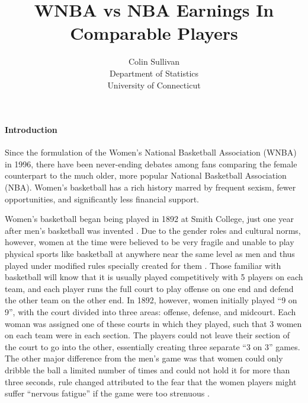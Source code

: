 \documentclass[12pt]{article}
\title{WNBA vs NBA Earnings In Comparable Players}
\author{Colin Sullivan\\
  Department of Statistics\\
  University of Connecticut
}
\begin{document}
\maketitle



\paragraph{Introduction}
Since the formulation of the Women’s National Basketball Association (WNBA) in 1996, there have been never-ending debates among fans comparing the female counterpart to the much older, more popular National Basketball Association (NBA). Women’s basketball has a rich history marred by frequent sexism, fewer opportunities, and significantly less financial support.
\par
Women’s basketball began being played in 1892 at Smith College, just one year after men’s basketball was invented \cite{Shattering_The_Glass}. Due to the gender roles and cultural norms, however, women at the time were believed to be very fragile and unable to play physical sports like basketball at anywhere near the same level as men and thus played under modified rules specially created for them \cite{WNBA_Hist}. Those familiar with basketball will know that it is usually played competitively with 5 players on each team, and each player runs the full court to play offense on one end and defend the other team on the other end. In 1892, however, women initially played “9 on 9”, with the court divided into three areas: offense, defense, and midcourt. Each woman was assigned one of these courts in which they played, such that 3 women on each team were in each section. The players could not leave their section of the court to go into the other, essentially creating three separate “3 on 3” games. The other major difference from the men’s game was that women could only dribble the ball a limited number of times and could not hold it for more than three seconds, rule changed attributed to the fear that the women players might suffer “nervous fatigue” if the game were too strenuous \cite{WNBA_Hist}.
\par
\end{document}
